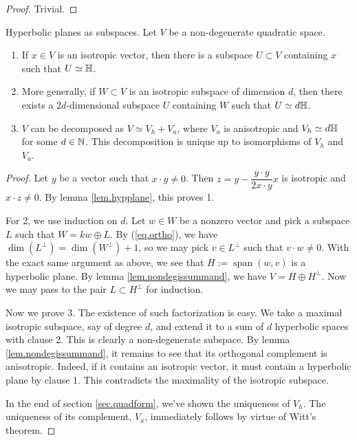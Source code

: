 \documentclass{article}
\begin{document}
\begin{proof}
    Trivial.
\end{proof}

\begin{proposition}\label{prop.hypplanewitt}
    Hyperbolic planes as subspaces. Let $V$ be a non-degenerate quadratic space.
    \begin{enumerate}
        \item If $x\in V$ is an isotropic vector, then there is a subspace $U\subset V$ containing $x$ such that $U\simeq \mathbb{H}$.
        \item More generally, if $W\subset V$ is an isotropic subspace of dimension $d$, then there exists a $2d$-dimensional subspace $U$ containing $W$ such that $U\simeq d\mathbb{H}$.
        \item $V$ can be decomposed as $V\simeq V_{h}+V_{a}$, where $V_{a}$ is anisotropic and $V_{h}\simeq d\mathbb{H}$ for some $d\in\mathbb{N}$. This decomposition is unique up to isomorphisms of $V_{h}$ and $V_{a}$.
    \end{enumerate}
\end{proposition}

\begin{proof}
    Let $y$ be a vector such that $x\cdot y\neq 0$. Then $z=y-\dfrac{y\cdot y}{2x\cdot y}x$ is isotropic and $x\cdot z\neq 0$. By lemma \ref{lem.hypplane}, this proves 1.

    For 2, we use induction on $d$. Let $w\in W$ be a nonzero vector and pick a subspace $L$ such that $W=kw\oplus L$. By (\ref{eq.ortho}), we have $\dim(L^\bot)=\dim(W^\bot)+1$, so we may pick $v\in L^\bot$ such that $v\cdot w\neq 0$. With the exact same argument as above, we see that $H:=\operatorname{span}(w,v)$ is a hyperbolic plane. By lemma \ref{lem.nondegissummand}, we have $V=H\oplus H^\bot$. Now we may pass to the pair $L\subset H^\bot$ for induction.

    Now we prove 3. The existence of such factorization is easy. We take a maximal isotropic subspace, say of degree $d$, and extend it to a sum of $d$ hyperbolic spaces with clause 2. This is clearly a non-degenerate subspace. By lemma \ref{lem.nondegissummand}, it remains to see that its orthogonal complement is anisotropic. Indeed, if it contains an isotropic vector, it must contain a hyperbolic plane by clause 1. This contradicts the maximality of the isotropic subspace.

    In the end of section \ref{sec.quadform}, we've shown the uniqueness of $V_{h}$. The uniqueness of its complement, $V_{a}$, immediately follows by virtue of Witt's theorem.
\end{proof}
\end{document}
